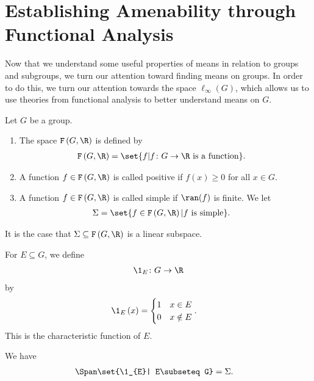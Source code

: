 \section{Establishing Amenability through Functional Analysis}\label{sec:functional_analysis_and_amenability}%
Now that we understand some useful properties of means in relation to groups and subgroups, we turn our attention toward finding means on groups. In order to do this, we turn our attention towards the space $\ell_{\infty}\left(G\right)$, which allows us to use theories from functional analysis to better understand means on $G$.
\begin{definition}
  Let $G$ be a group.
  \begin{enumerate}[(1)]
    \item The space $\mathcal{F}\left(G,\R\right)$ is defined by
      \begin{align*}
        \mathcal{F}\left(G,\R\right) &= \set{f | f\colon G\rightarrow \R\text{ is a function}}.
      \end{align*}
    \item A function $f\in \mathcal{F}\left(G,\R\right)$ is called positive if $f(x) \geq 0$ for all $x\in G$.
    \item A function $f\in \mathcal{F}\left(G,\R\right)$ is called simple if $\ran(f)$ is finite. We let
      \begin{align*}
        \Sigma &= \set{f\in \mathcal{F}\left(G,\R\right) | f\text{ is simple}}.
      \end{align*}
  \end{enumerate}
\end{definition}
\begin{fact}
  It is the case that $\Sigma \subseteq \mathcal{F}\left(G,\R\right)$ is a linear subspace.
\end{fact}
\begin{definition}
  For $E\subseteq G$, we define
  \begin{align*}
    \1_{E}\colon G\rightarrow \R
  \end{align*}
  by
  \begin{align*}
    \1_{E}\left(x\right) &= \begin{cases}
      1 & x\in E\\
      0 & x\notin E
    \end{cases}.
  \end{align*}
  This is the characteristic function of $E$.
\end{definition}
\begin{fact}
  We have
  \begin{align*}
    \Span\set{\1_{E}| E\subseteq G} &= \Sigma.
  \end{align*}
\end{fact}
